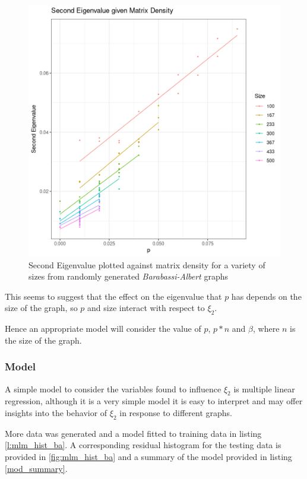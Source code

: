 \documentclass[11pt, twoside]{report}
\begin{document}
\begin{figure}[htbp]
\centering
\includegraphics[width=12cm]{media/ba_constant_size_plot.png}
\caption{\label{fig:ba_data_constant_size_plot} Second Eigenvalue plotted against matrix density for a variety of sizes from randomly generated \textit{Barabassi-Albert} graphs}
\end{figure}


This seems to suggest that the effect on the eigenvalue that \(p\) has depends on the size of the graph, so  \(p\) and size interact with respect to \(\xi_{2}\).

Hence an appropriate model will consider the value of \(p\), \(p*n\) and \(\beta\), where \(n\) is the size of the graph.

\subsubsection{Model}
\label{sec:org767df9c}
A simple model to consider the variables found to influence \(\xi_{2}\) is
multiple linear regression, although it is a very simple model it is easy to
interpret and may offer insights into the behavior of \(\xi_{2}\) in response
to different graphs.

More data was generated and a model fitted to training data in listing
\ref{l:mlm_hist_ba}. A corresponding residual histogram for the testing data is
provided in \ref{fig:mlm_hist_ba} and a summary of the model provided in listing
\ref{mod_summary}.
\end{document}

